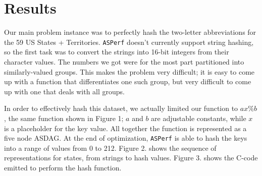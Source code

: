 \documentclass{article}
\begin{document}
\section{Results}

Our main problem instance was to perfectly hash the two-letter abbreviations for the 59 US States + Territories. \texttt{ASPerf} doesn't currently support string hashing, so the first task was to convert the strings into 16-bit integers from their character values. The numbers we got were for the most part partitioned into similarly-valued groups. This makes the problem very difficult; it is easy to come up with a function that differentiates one such group, but very difficult to come up with one that deals with all groups.

In order to effectively hash this dataset, we actually limited our function to $ax \% b$, the same function shown in Figure 1; $a$ and $b$ are adjustable constants, while $x$ is a placeholder for the key value. All together the function is represented as a five node ASDAG. At the end of optimization, \texttt{ASPerf} is able to hash the keys into a range of values from 0 to 212. Figure 2. shows the sequence of representations for states, from strings to hash values. Figure 3. shows the C-code emitted to perform the hash function.
\end{document}
